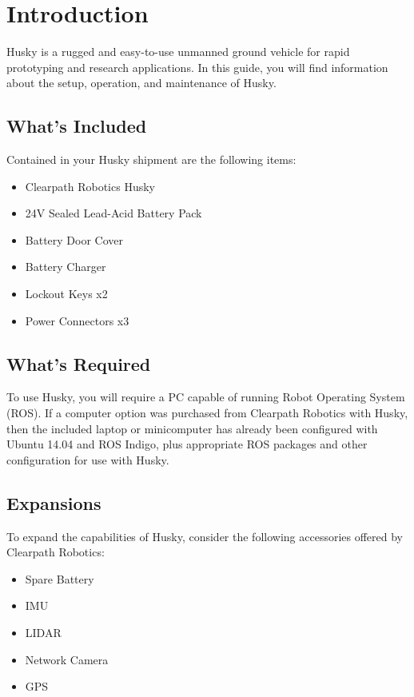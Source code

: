 \documentclass[]{clearpath-latex/clearpath-manual}
\begin{document}
\tableofcontents

\section{Introduction}

Husky is a rugged and easy-to-use unmanned ground vehicle for rapid prototyping and research applications. In this guide, you will find information about the setup, operation, and maintenance of Husky.

\subsection{What's Included}

Contained in your Husky shipment are the following items:

\begin{itemize}[nolistsep]
  \item Clearpath Robotics Husky
  \item 24V Sealed Lead-Acid Battery Pack
  \item Battery Door Cover
  \item Battery Charger
  \item Lockout Keys x2
  \item Power Connectors x3
\end{itemize}


\subsection{What's Required}

To use Husky, you will require a PC capable of running Robot Operating System (ROS).
If a computer option was purchased from Clearpath Robotics with Husky, then the included laptop or minicomputer has 
already been configured with Ubuntu 14.04 and ROS Indigo, plus appropriate ROS packages and other configuration for use with Husky.

\subsection{Expansions}
To expand the capabilities of Husky, consider the following accessories offered by Clearpath Robotics:


\begin{itemize}[nolistsep]
  \item Spare Battery
  \item IMU
  \item LIDAR
  \item Network Camera
  \item GPS
\end{itemize}
\end{document}
